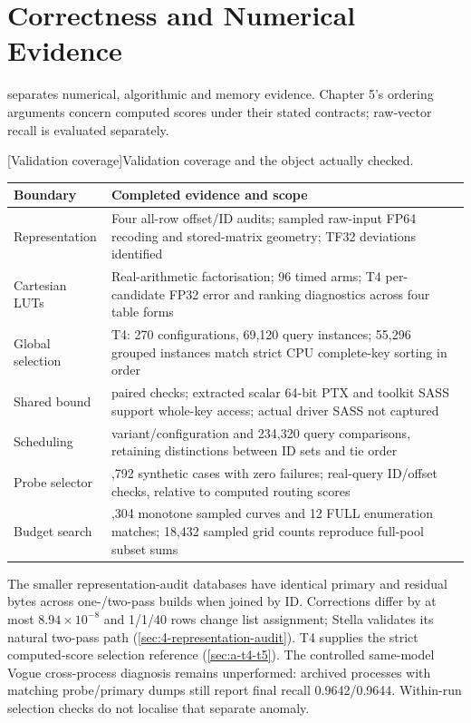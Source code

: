 \par\endgroup

\section{Correctness and Numerical Evidence}
\label{sec:b-correctness}
 separates numerical, algorithmic and memory evidence.
Chapter 5's ordering arguments concern computed scores under their
stated contracts; raw-vector recall is evaluated separately.

\par\medskip\noindent\begin{minipage}{\linewidth}
\centering\captionsetup{hypcap=false}
[Validation coverage]{Validation coverage and the object actually checked.}
\label{tab:b-checks}
\footnotesize\setlength{\tabcolsep}{4pt}
\begin{tabularx}{\linewidth}{@{}>{\raggedright\arraybackslash}p{.22\linewidth}>{\raggedright\arraybackslash}X@{}}
\toprule
Boundary & Completed evidence and scope \\
\midrule
Representation & Four all-row offset/ID audits; sampled raw-input FP64
recoding and stored-matrix geometry; TF32 deviations identified \\
Cartesian LUTs & Real-arithmetic factorisation; 96 timed arms; T4
per-candidate FP32 error and ranking diagnostics across four table forms \\
Global selection & T4: 270 configurations, 69,120 query instances;
55,296 grouped instances match strict CPU complete-key sorting in order \\
Shared bound & 48 paired checks; extracted scalar 64-bit PTX and toolkit
SASS support whole-key access; actual driver SASS not captured \\
Scheduling & 250 variant/configuration and 234,320 query comparisons,
retaining distinctions between ID sets and tie order \\
Probe selector & 1,792 synthetic cases with zero failures; real-query
ID/offset checks, relative to computed routing scores \\
Budget search & 2,304 monotone sampled curves and 12 FULL enumeration
matches; 18,432 sampled grid counts reproduce full-pool subset sums \\
\bottomrule
\end{tabularx}
\end{minipage}\par\medskip

The smaller representation-audit databases have identical primary and
residual bytes across one-/two-pass builds when joined by ID.
Corrections differ by at most $8.94\times10^{-8}$ and 1/\allowbreak{}1/\allowbreak{}40 rows change
list assignment; Stella validates its natural two-pass path
(\cref{sec:4-representation-audit}). T4 supplies the strict
computed-score selection reference (\cref{sec:a-t4-t5}). The controlled
same-model Vogue cross-process diagnosis remains unperformed: archived
processes with matching probe/primary dumps still report final recall
0.9642/\allowbreak{}0.9644. Within-run selection checks do not localise
that separate anomaly.

